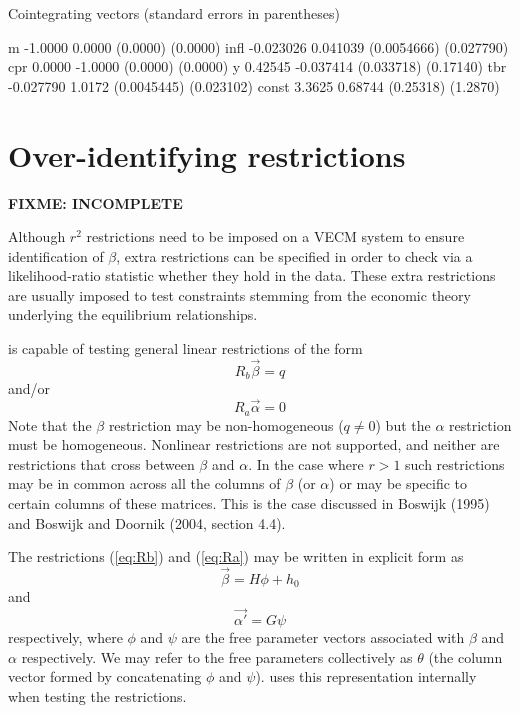 \begin{code}
Cointegrating vectors (standard errors in parentheses)

m          -1.0000       0.0000 
           (0.0000)     (0.0000) 
infl     -0.023026     0.041039 
        (0.0054666)   (0.027790) 
cpr         0.0000      -1.0000 
           (0.0000)     (0.0000) 
y          0.42545    -0.037414 
         (0.033718)    (0.17140) 
tbr      -0.027790       1.0172 
        (0.0045445)   (0.023102) 
const       3.3625      0.68744 
          (0.25318)     (1.2870) 
\end{code}

\section{Over-identifying restrictions}
\label{sec:johansen-overid}

\textbf{FIXME: INCOMPLETE}

Although $r^2$ restrictions need to be imposed on a VECM system to
ensure identification of $\beta$, extra restrictions can be specified
in order to check via a likelihood-ratio statistic whether they hold
in the data. These extra restrictions are usually imposed to test
constraints stemming from the economic theory underlying the
equilibrium relationships.

 is capable of testing general linear restrictions of the
form 
\begin{equation}
\label{eq:Rb}
R_b \vec{\beta} = q
\end{equation}
and/or
\begin{equation}
\label{eq:Ra}
R_a \vec{\alpha} = 0
\end{equation}
%
Note that the $\beta$ restriction may be non-homogeneous ($q \neq 0$)
but the $\alpha$ restriction must be homogeneous.  Nonlinear
restrictions are not supported, and neither are restrictions that
cross between $\beta$ and $\alpha$.  In the case where $r > 1$ such
restrictions may be in common across all the columns of $\beta$ (or
$\alpha$) or may be specific to certain columns of these matrices.
This is the case discussed in Boswijk (1995) and Boswijk and Doornik
(2004, section 4.4).

The restrictions (\ref{eq:Rb}) and (\ref{eq:Ra}) may be written in
explicit form as
\begin{equation}
\label{eq:vecbeta}
\vec{\beta} = H\phi + h_0
\end{equation}
and
\begin{equation}
\label{eq:vecalpha}
\vec{\alpha'} = G\psi
\end{equation}
respectively, where $\phi$ and $\psi$ are the free parameter vectors
associated with $\beta$ and $\alpha$ respectively.  We may refer
to the free parameters collectively as $\theta$ (the column vector
formed by concatenating $\phi$ and $\psi$).   uses this
representation internally when testing the restrictions.

